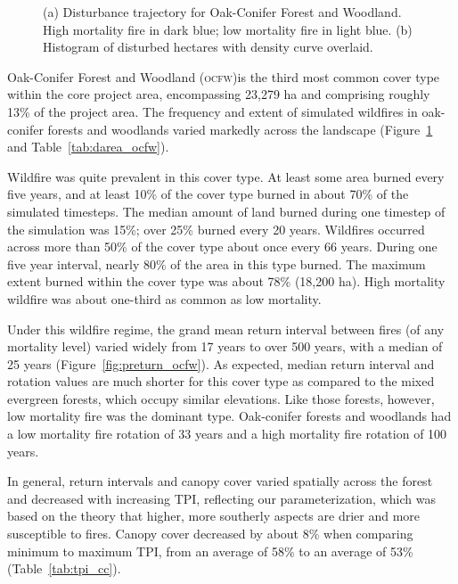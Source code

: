 \begin{figure}[!htbp]
  \centering
  \caption{\small (a) Disturbance trajectory for Oak-Conifer Forest and Woodland. High mortality fire in dark blue; low mortality fire in light blue. (b) Histogram of disturbed hectares with density curve overlaid.} 
  \label{fig:darea_ocfw}
\end{figure}

Oak-Conifer Forest and Woodland (\textsc{ocfw})is the third most common cover type within the core project area, encompassing 23,279 ha and comprising roughly 13\% of the project area. The frequency and extent of simulated wildfires in oak-conifer forests and woodlands varied markedly across the landscape (Figure~\ref{fig:darea_ocfw} and Table~\ref{tab:darea_ocfw}). 

Wildfire was quite prevalent in this cover type. At least some area burned every five years, and at least 10\% of the cover type burned in about 70\% of the simulated timesteps. The median amount of land burned during one timestep of the simulation was 15\%; over 25\% burned every 20 years. Wildfires occurred across more than 50\% of the cover type about once every 66 years. During one five year interval, nearly 80\% of the area in this type burned. The maximum extent burned within the cover type was about 78\% (18,200 ha). High mortality wildfire was about one-third as common as low mortality. 

Under this wildfire regime, the grand mean return interval between fires (of any mortality level) varied widely from 17 years to over 500 years, with a median of 25 years (Figure~\ref{fig:preturn_ocfw}). As expected, median return interval and rotation values are much shorter for this cover type as compared to the mixed evergreen forests, which occupy similar elevations. Like those forests, however, low mortality fire was the dominant type. Oak-conifer forests and woodlands had a low mortality fire rotation of 33 years and a high mortality fire rotation of 100 years. 

In general, return intervals and canopy cover varied spatially across the forest and decreased with increasing TPI, reflecting our parameterization, which was based on the theory that higher, more southerly aspects are drier and more susceptible to fires. Canopy cover decreased by about 8\% when comparing minimum to maximum TPI, from an average of 58\% to an average of 53\% (Table~\ref{tab:tpi_cc}). 

